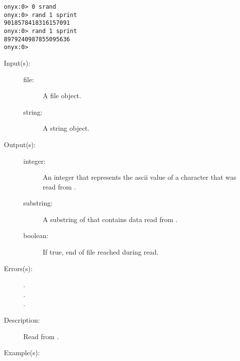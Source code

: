 \begin{description}
\begin{description}
\begin{verbatim}
onyx:0> 0 srand
onyx:0> rand 1 sprint
9018578418316157091
onyx:0> rand 1 sprint
8979240987855095636
onyx:0>
		\end{verbatim}
	\end{description}
\label{systemdict:read}
\item[{\onyxop{file}{read}{integer boolean}}: ]
\item[{\onyxop{file string}{read}{substring boolean}}: ]
	\begin{description}\item[]
	\item[Input(s): ]
		\begin{description}\item[]
		\item[file: ]
			A file object.
		\item[string: ]
			A string object.
		\end{description}
	\item[Output(s): ]
		\begin{description}\item[]
		\item[integer: ]
			An integer that represents the ascii value of a
			character that was read from .
		\item[substring: ]
			A substring of  that contains data
			read from .
		\item[boolean: ]
			If true, end of file reached during read.
		\end{description}
	\item[Errors(s): ]
		\begin{description}\item[]
		\item[.]
		\item[.]
		\item[.]
		\end{description}
	\item[Description: ]
		Read from .
	\item[Example(s): ]\begin{verbatim}


\end{verbatim}
\end{description}
\end{description}
